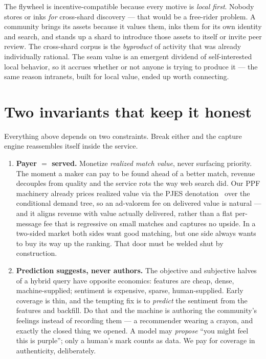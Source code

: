 \documentclass[11pt]{article}
\newcommand{\invariant}[1]{\textbf{\color{accent}#1}}
\begin{document}
\begin{keybox}
The flywheel is incentive-compatible because every motive is \emph{local first}. Nobody stores or inks \emph{for} cross-shard discovery --- that would be a free-rider problem. A community brings its assets because it values them, inks them for its own identity and search, and stands up a shard to introduce those assets to itself or invite peer review. The cross-shard corpus is the \emph{byproduct} of activity that was already individually rational. The seam value is an emergent dividend of self-interested local behavior, so it accrues whether or not anyone is trying to produce it --- the same reason intranets, built for local value, ended up worth connecting.
\end{keybox}

\section{Two invariants that keep it honest}

Everything above depends on two constraints. Break either and the capture engine reassembles itself inside the service.

\begin{enumerate}[leftmargin=1.4em, itemsep=8pt]
  \item \invariant{Payer $=$ served.} Monetize \emph{realized match value}, never surfacing priority. The moment a maker can pay to be found ahead of a better match, revenue decouples from quality and the service rots the way web search did. Our PPF machinery already prices realized value via the PJES denotation~\cite{pjes,finRho} over the conditional demand tree, so an ad-valorem fee on delivered value is natural --- and it aligns revenue with value actually delivered, rather than a flat per-message fee that is regressive on small matches and captures no upside. In a two-sided market both sides want good matching, but one side always wants to buy its way up the ranking. That door must be welded shut by construction.
  \item \invariant{Prediction suggests, never authors.} The objective and subjective halves of a hybrid query have opposite economics: features are cheap, dense, machine-supplied; sentiment is expensive, sparse, human-supplied. Early coverage is thin, and the tempting fix is to \emph{predict} the sentiment from the features and backfill. Do that and the machine is authoring the community's feelings instead of recording them --- a recommender wearing a crayon, and exactly the closed thing we opened. A model may \emph{propose} ``you might feel this is purple''; only a human's mark counts as data. We pay for coverage in authenticity, deliberately.
\end{enumerate}
\end{document}
